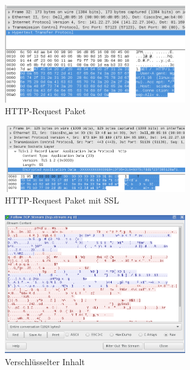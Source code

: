 \documentclass[paper=a4, fontsize=11pt]{scrreprt}
\numberwithin{equation}{section}
\numberwithin{figure}{section}
\numberwithin{table}{section}
\begin{document}
\begin{figure}[!htb] 
  \centering
     \includegraphics[width=0.7\textwidth]{resources/paket-http.png}
  \caption{HTTP-Request Paket}
  \label{fig:http-package}
\end{figure}

\begin{figure}[!htb] 
  \centering
     \includegraphics[width=0.7\textwidth]{resources/https-package.png}
  \caption{HTTP-Request Paket mit SSL}
  \label{fig:https-package}
\end{figure}

\begin{figure}[!htb] 
  \centering
     \includegraphics[width=0.7\textwidth]{resources/ssl-data.png}
  \caption{Verschlüsselter Inhalt}
  \label{fig:ssl-data}
\end{figure}
\end{document}
